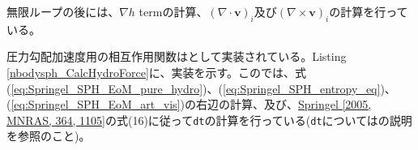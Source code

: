 無限ループの後には、$\nabla h$ termの計算、$(\nabla \cdot \bm{v})_{i}$及び$(\nabla\times \bm{v})_{i}$の計算を行っている。

\ifCpp %

\endifCpp
\ifFtn %

\endifFtn
\ifC %

\endifC

圧力勾配加速度用の相互作用関数はとして実装されている。Listing \ref{nbodysph_CalcHydroForce}に、実装を示す。この\procedure では、式(\ref{eq:Springel_SPH_EoM_pure_hydro})、(\ref{eq:Springel_SPH_entropy_eq})、(\ref{eq:Springel_SPH_EoM_art_vis})の右辺の計算、及び、\href{https://doi.org/10.1111/j.1365-2966.2005.09655.x}{Springel [2005, MNRAS, 364, 1105]}の式(16)に従って\texttt{dt}の計算を行っている(\texttt{dt}についてはの説明を参照のこと)。

\ifCpp %

\endifCpp
\ifFtn %

\endifFtn
\ifC %

\endifC


